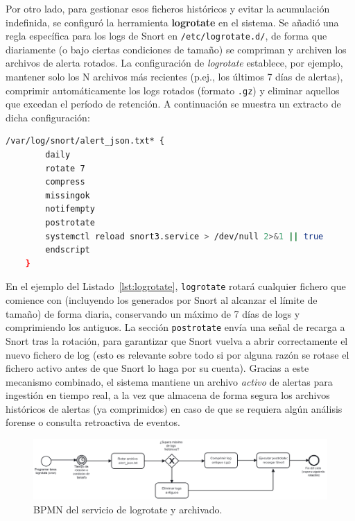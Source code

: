 \documentclass[11pt,a4paper,twoside]{report}
\begin{document}
Por otro lado, para gestionar esos ficheros históricos y evitar la acumulación indefinida, se configuró la herramienta \textbf{logrotate} en el sistema. Se añadió una regla específica para los logs de Snort en \texttt{/etc/logrotate.d/}, de forma que diariamente (o bajo ciertas condiciones de tamaño) se compriman y archiven los archivos de alerta rotados. La configuración de \textit{logrotate} establece, por ejemplo, mantener solo los N archivos más recientes (p.ej., los últimos 7 días de alertas), comprimir automáticamente los logs rotados (formato \texttt{.gz}) y eliminar aquellos que excedan el período de retención. A continuación se muestra un extracto de dicha configuración:

\begin{lstlisting}[language=bash, caption={Regla de logrotate para los logs de Snort}, label={lst:logrotate}]
	/var/log/snort/alert_json.txt* {
		daily
		rotate 7
		compress
		missingok
		notifempty
		postrotate
		systemctl reload snort3.service > /dev/null 2>&1 || true
		endscript
	}
\end{lstlisting}

En el ejemplo del Listado~\ref{lst:logrotate}, \texttt{logrotate} rotará cualquier fichero que comience con  (incluyendo los generados por Snort al alcanzar el límite de tamaño) de forma diaria, conservando un máximo de 7 días de logs y comprimiendo los antiguos. La sección \texttt{postrotate} envía una señal de recarga a Snort tras la rotación, para garantizar que Snort vuelva a abrir correctamente el nuevo fichero de log (esto es relevante sobre todo si por alguna razón se rotase el fichero activo antes de que Snort lo haga por su cuenta). Gracias a este mecanismo combinado, el sistema mantiene un archivo \textit{activo} de alertas para ingestión en tiempo real, a la vez que almacena de forma segura los archivos históricos de alertas (ya comprimidos) en caso de que se requiera algún análisis forense o consulta retroactiva de eventos.

\begin{figure}[H]
	\centering
	\includegraphics[width=1\textwidth]{documento/25.png}
	\caption{BPMN del servicio de logrotate y archivado.}
	\label{fig:bpmn-logrotate}
\end{figure}
\end{document}

